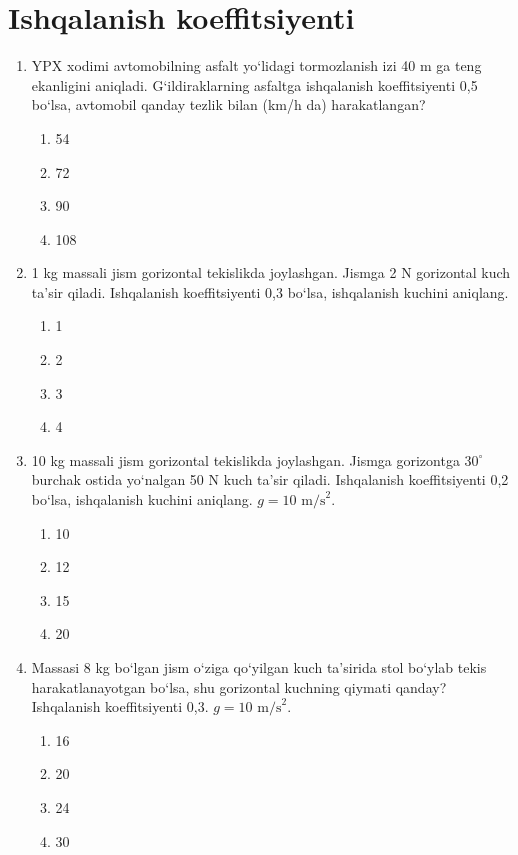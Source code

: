 
\section{Ishqalanish koeffitsiyenti}

\begin{enumerate}

\item YPX xodimi avtomobilning asfalt yo‘lidagi tormozlanish izi 40 m ga
teng ekanligini aniqladi. G‘ildiraklarning asfaltga ishqalanish
koeffitsiyenti 0,5 bo‘lsa, avtomobil qanday tezlik bilan (km/h da)
harakatlangan?

\begin{enumerate}[label=\Alph*)]
\item 54
\item 72
\item 90
\item 108
\end{enumerate}

\item 1 kg massali jism gorizontal tekislikda joylashgan. Jismga
2 N gorizontal kuch ta’sir qiladi. Ishqalanish koeffitsiyenti 0,3
bo‘lsa, ishqalanish kuchini aniqlang.

\begin{enumerate}[label=\Alph*)]
\item 1
\item 2
\item 3
\item 4
\end{enumerate}

\item 10 kg massali jism gorizontal tekislikda joylashgan.
Jismga gorizontga $30^\circ$ burchak ostida yo‘nalgan
50 N kuch ta’sir qiladi. Ishqalanish koeffitsiyenti 0,2 bo‘lsa,
ishqalanish kuchini aniqlang. $g=10\text{ m/s}^2$.

\begin{enumerate}[label=\Alph*)]
\item 10
\item 12
\item 15
\item 20
\end{enumerate}

\item Massasi 8 kg bo‘lgan jism o‘ziga qo‘yilgan kuch ta’sirida
stol bo‘ylab tekis harakatlanayotgan bo‘lsa, shu gorizontal
kuchning qiymati qanday? Ishqalanish koeffitsiyenti 0,3.
$g=10\text{ m/s}^2$.

\begin{enumerate}[label=\Alph*)]
\item 16
\item 20
\item 24
\item 30
\end{enumerate}


\end{enumerate}
